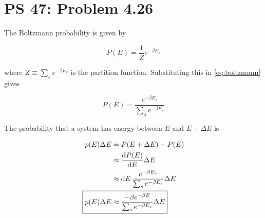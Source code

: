 \documentclass[12pt,a4paper]{article}
\begin{document}
\setcounter{page}{1}

\section*{PS 47: Problem 4.26}
\bigskip

The Boltzmann probability is given by

\begin{equation}
	P(E) = \frac{1}{Z} e^{-\beta E_s} \label{eq:boltzmann}
\end{equation}

where $Z \equiv \sum_s e^{-\beta E_s}$ is the partition function. Substituting this in \eqref{eq:boltzmann} gives

\begin{equation}
	P(E) = \frac{e^{-\beta E_s}}{\sum_s e^{-\beta E_s}} \label{eq:boltzmann-partition}
\end{equation}

The probability that a system has energy between $E$ and $E + \Delta E$ is

\begin{align}
	p(E)\Delta E &= P(E + \Delta E) - P(E) \\
	&\approx \dv{P(E)}{E}\Delta E \label{eq:density-approx} \\
	&\approx \dd{E} \frac{e^{-\beta E_s}}{\sum_s e^{-\beta E_s}} \Delta E \nonumber \\
	\Aboxed{
		p(E)\Delta E &\approx \frac{-\beta e^{-\beta E}}{\sum_s e^{-\beta E_s}}\Delta E 
	} \label{eq:answer}
\end{align}
\end{document}
